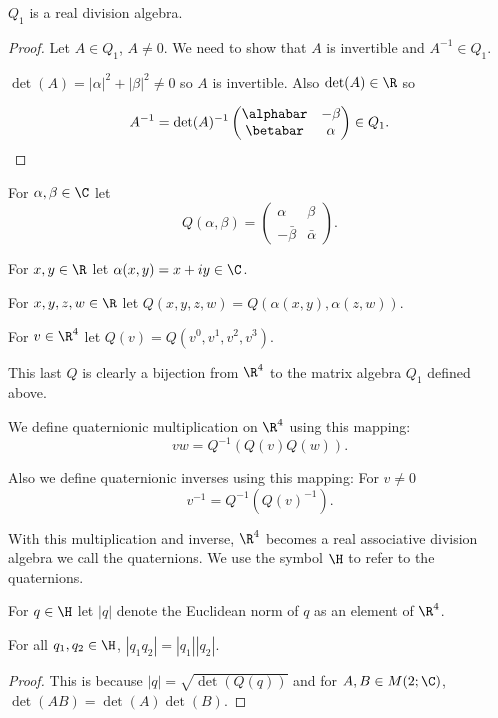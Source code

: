 \documentclass[oneside,12pt]{amsart}
\begin{document}
\begin{lemma}  $Q_1$ is a real division algebra.
\end{lemma}
\begin{proof}
Let $A\in Q_1$, $A\not=0$. We need to show that $A$ is invertible and $A^{-1}\in Q_1$.

$\det(A) = |\alpha|^2 + |\beta|^2 \not = 0$ so $A$ is invertible.
Also $\det(A)\in\R$ so

$$A^{-1} = \det(A)^{-1} \begin{pmatrix}
\alphabar & -\beta \\
\betabar & \alpha
\end{pmatrix} \in Q_1.$$

\end{proof}


For $\alpha,\beta \in \C$ let 
$$Q(\alpha,\beta) = \begin{pmatrix}
\alpha & \beta \\
-\bar{\beta} & \bar{\alpha}
\end{pmatrix}.$$

For $x,y\in\R$ let $\alpha(x,y) = x + iy\in\C$.

For $x,y,z,w\in\R$ let $Q(x,y,z,w) = Q(\alpha(x,y), \alpha(z,w))$.

For $v\in\R^4$ let $Q(v) = Q(v^0, v^1, v^2, v^3)$.

This last $Q$ is clearly a bijection from $\R^4$ to the matrix algebra $Q_1$ defined above. 

\begin{definition}
We
define quaternionic multiplication on $\R^4$ using this mapping:
$$vw = Q^{-1}(Q(v)Q(w)).$$

Also we define quaternionic inverses using this mapping:
For $v\not=0$
$$v^{-1} = Q^{-1}(Q(v)^{-1}).$$

With this multiplication and inverse, $\R^4$ becomes a real associative division algebra we call the quaternions.
We use the symbol $\H$ to refer to the quaternions.

For $q\in\H$ let $|q|$ denote the Euclidean norm of $q$ as an element of $\R^4$.
\end{definition}

\begin{lemma}
For all $q_1,q_2 \in \H$, $|q_1 q_2| = |q_1| |q_2|$.
\end{lemma}
\begin{proof}
This is because $|q| = \sqrt{\det(Q(q))}$ and for $A,B\in M(2; \C)$,
$\det(AB) = \det(A)\det(B)$.
\end{proof}
\end{document}
